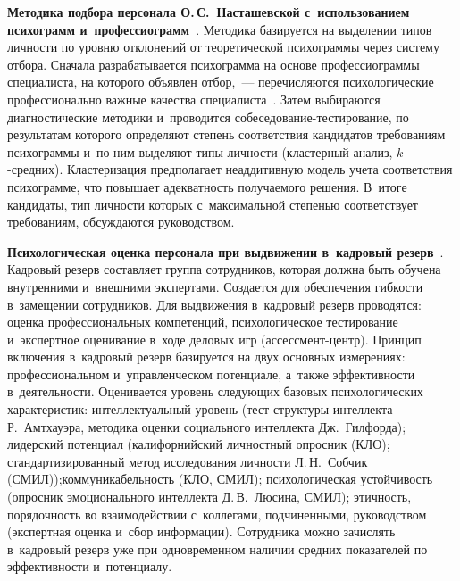 \begin{multicols}{2}
  \textbf{Методика подбора персонала О.\,С.~Насташевской с~использованием 
психограмм и~профессиограмм}~\cite{28-r}. Методика базируется на выделении 
типов лич\-ности по уровню отклонений от тео\-ре\-ти\-че\-ской психограммы через 
сис\-те\-му отбора. Сначала разрабатывается психограмма на основе 
\mbox{профессиограммы} специалиста, на которого объявлен отбор,~--- пе\-ре\-чис\-ля\-ют\-ся 
психологические профессионально важ\-ные качества специалиста~\cite{7-r}. 
Затем выбираются диагностические методики и~проводится со\-бе\-се\-до\-ва\-ние-тес\-ти\-ро\-ва\-ние, 
по результатам которого определяют степень соответствия 
кандидатов требованиям психограммы и~по ним выделяют типы лич\-ности 
(кластерный анализ, $k$-сред\-них). Кластеризация предполагает неаддитивную 
модель учета соответствия психограмме, что повышает адекват\-ность 
получаемого решения. В~итоге кандидаты, тип лич\-ности которых 
с~максимальной степенью соответствует требованиям, об\-суж\-да\-ют\-ся 
руководством.
  
  \textbf{Психологическая оценка персонала при выдвижении в~кад\-ро\-вый 
резерв}~\cite{29-r}.
  Кадровый резерв составляет группа сотрудников, которая долж\-на быть 
обучена внут\-рен\-ни\-ми и~внеш\-ни\-ми экспертами. Создается для обеспечения 
гиб\-кости в~замещении сотрудников. Для выдвижения в~кадровый резерв 
проводятся: оценка профессиональных компетенций, психологическое 
тес\-ти\-ро\-ва\-ние и~экспертное оценивание в~ходе деловых игр (ассесс\-мент-центр). 
Принцип включения в~кадровый резерв базируется на двух основных 
измерениях: профессиональном и~управ\-лен\-че\-ском потенциале, а~также 
эф\-фек\-тив\-ности в~дея\-тель\-ности. Оценивается уровень сле\-ду\-ющих базовых 
психологических характеристик: интеллектуальный уровень (тест структуры 
интеллекта Р.~Амтхауэра, методика оценки социального интеллекта 
Дж.~Гилфорда); лидерский потенциал (калифорнийский личностный опросник
(КЛО); стандартизированный метод исследования лич\-ности Л.\,Н.~Собчик 
(СМИЛ));\linebreak коммуникабельность (КЛО, СМИЛ); психологическая устой\-чи\-вость 
(опросник эмоционального интеллекта Д.\,В.~Люсина, СМИЛ); этич\-ность, 
по\-ря\-доч\-ность во взаимодействии с~коллегами, \mbox{подчиненными}, руководством 
(экспертная оценка и~сбор информации). Со\-труд\-ни\-ка мож\-но за\-чис\-лять 
в~кадровый резерв уже при одновременном наличии сред\-них показателей по 
эф\-фек\-тив\-ности и~потенциалу.
  

\end{multicols}
